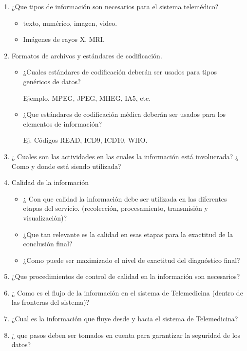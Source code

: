 \begin{enumerate}
\item ¿Que tipos de información son necesarios para el sistema telemédico? 
\begin{itemize}
\item texto, numérico, imagen, video.
\item Imágenes de rayos X, MRI.
\end{itemize}

\item Formatos de archivos y estándares de codificación. 

\begin{itemize}
\item ¿Cuales estándares de codificación deberán ser usados para tipos genéricos de datos? 

Ejemplo. MPEG, JPEG, MHEG, IA5, etc.
\item ¿Que estándares de codificación médica deberán ser usados para los elementos de información? 

Ej. Códigos READ, ICD9, ICD10, WHO.
\end{itemize}
\item ¿ Cuales son las actividades en las cuales la información está involucrada? ¿ Como y donde está siendo utilizada?
\item Calidad de la información 

\begin{itemize}
\item ¿ Con que calidad la información debe ser utilizada en las diferentes etapas del servicio. (recolección, procesamiento, transmisión y visualización)?
\item ¿Que tan relevante es la calidad en esas etapas para la exactitud de la conclusión final?
\item ¿Como puede ser maximizado el nivel de exactitud del diagnóstico final?
\end{itemize}

\item ¿Que procedimientos de control de calidad en la información son necesarios?
\item ¿ Como es el flujo de la información en el sistema de Telemedicina (dentro de las fronteras del sistema)?
\item ¿Cual es la información que fluye desde y hacia el sistema de Telemedicina?
\item ¿ que pasos deben ser tomados en cuenta para garantizar la seguridad de los datos?
\end{enumerate}
